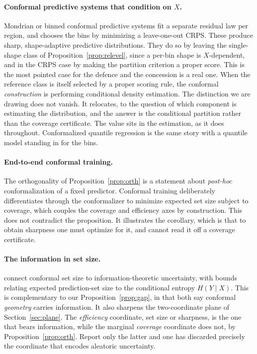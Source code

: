 \documentclass[11pt]{article}
\theoremstyle{definition}
\begin{document}
\paragraph{Conformal predictive systems that condition on $X$.}
Mondrian or binned conformal predictive systems \citep{bostrom2021mondrian} fit a separate
residual law per region, and \citet{toccaceli2026crps} chooses the bins by minimizing a
leave-one-out CRPS. These produce sharp, shape-adaptive predictive distributions. They do so
by leaving the single-shape class of Proposition~\ref{prop:relevel}, since a per-bin shape
is $X$-dependent, and in the CRPS case by making the partition criterion a proper score.
This is the most pointed case for the defence and the concession is a real one. When the
reference class is itself selected by a proper scoring rule, the conformal
\emph{construction} is performing conditional density estimation. The distinction we are
drawing does not vanish. It relocates, to the question of which component is estimating the
distribution, and the answer is the conditional partition rather than the coverage
certificate. The value sits in the estimation, as it does throughout. Conformalized quantile
regression \citep{romano2019conformalized} is the same story with a quantile model standing
in for the bins.

\paragraph{End-to-end conformal training.}
The orthogonality of Proposition~\ref{prop:orth} is a statement about \emph{post-hoc}
conformalization of a fixed predictor. Conformal training
\citep{stutz2022learning,correia2024information} deliberately differentiates through the
conformalizer to minimize expected set size subject to coverage, which couples the coverage
and efficiency axes by construction. This does not contradict the proposition. It
illustrates the corollary, which is that to obtain sharpness one must optimize for it, and
cannot read it off a coverage certificate.

\paragraph{The information in set size.}
\citet{correia2024information} connect conformal set size to information-theoretic
uncertainty, with bounds relating expected prediction-set size to the conditional entropy
$H(Y\mid X)$. This is complementary to our Proposition~\ref{prop:gap}, in that both say
conformal \emph{geometry} carries information. It also sharpens the two-coordinate plane of
Section~\ref{sec:plane}. The \emph{efficiency} coordinate, set size or sharpness, is the one
that bears information, while the marginal \emph{coverage} coordinate does not, by
Proposition~\ref{prop:orth}. Report only the latter and one has discarded precisely the
coordinate that encodes aleatoric uncertainty.
\end{document}
